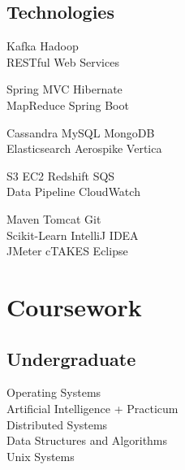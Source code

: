 \documentclass[]{rajnikant-resume-openfont}
\begin{document}
\begin{minipage}[t]{0.33\textwidth}
\subsection{Technologies}
 Kafka   \textbullet{} Hadoop \\
 RESTful Web Services
 \sectionsep
 
 Spring MVC \textbullet{} Hibernate \\ 
 MapReduce  \textbullet{} Spring Boot
\sectionsep

 Cassandra  \textbullet{} MySQL \textbullet{} MongoDB \\
   Elasticsearch 
  \textbullet{} Aerospike \textbullet{} Vertica
 \sectionsep
 
 S3  \textbullet{} EC2  \textbullet{} Redshift \textbullet{} SQS \\
 Data Pipeline  \textbullet{} CloudWatch‎ 
  
 \sectionsep
 
      Maven \textbullet{} Tomcat \textbullet{} Git \\
       Scikit-Learn  \textbullet{} IntelliJ IDEA \\
      JMeter \textbullet{} cTAKES \textbullet{} Eclipse 
\sectionsep



\section{Coursework}
\subsection{Undergraduate}
Operating Systems \\
Artificial Intelligence + Practicum \\
Distributed Systems \\
Data Structures and Algorithms\\
Unix Systems 
\sectionsep



%
%

\end{minipage} 
\hfill
\end{document}
